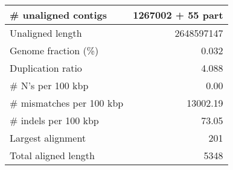 \documentclass[12pt,a4paper]{article}
\begin{document}
\begin{table}[ht]
\begin{center}
\begin{tabular}{|l*{1}{|r}|}
\# unaligned contigs & 1267002 + 55 part \\ \hline
Unaligned length & 2648597147 \\ \hline
Genome fraction (\%) & 0.032 \\ \hline
Duplication ratio & 4.088 \\ \hline
\# N's per 100 kbp & 0.00 \\ \hline
\# mismatches per 100 kbp & 13002.19 \\ \hline
\# indels per 100 kbp & 73.05 \\ \hline
Largest alignment & 201 \\ \hline
Total aligned length & 5348 \\ \hline
\end{tabular}
\end{center}
\end{table}
\end{document}
